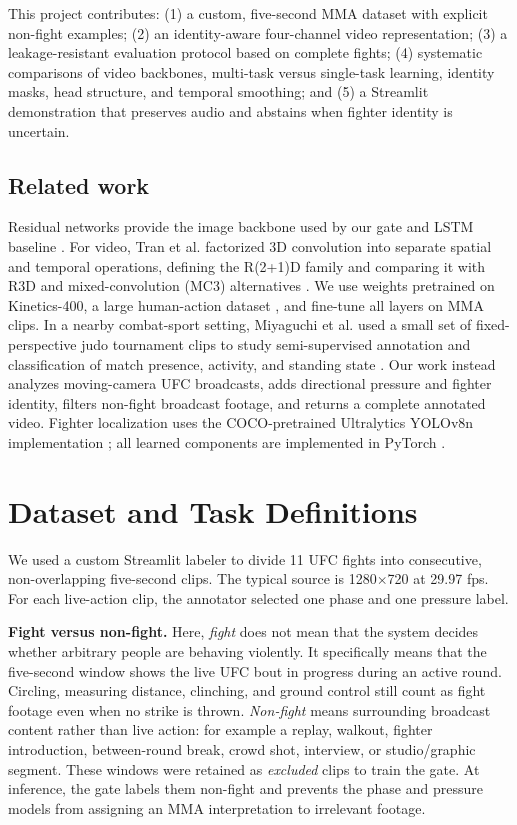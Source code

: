\documentclass[10pt,twocolumn]{article}
\newcommand{\Rtwo}{R(2+1)D}
\begin{document}
This project contributes: (1) a custom, five-second MMA dataset with explicit non-fight examples; (2) an identity-aware four-channel video representation; (3) a leakage-resistant evaluation protocol based on complete fights; (4) systematic comparisons of video backbones, multi-task versus single-task learning, identity masks, head structure, and temporal smoothing; and (5) a Streamlit demonstration that preserves audio and abstains when fighter identity is uncertain.

\subsection{Related work}

Residual networks provide the image backbone used by our gate and LSTM baseline \cite{he2016deep,hochreiter1997lstm}. For video, Tran et al. factorized 3D convolution into separate spatial and temporal operations, defining the \Rtwo{} family and comparing it with R3D and mixed-convolution (MC3) alternatives \cite{tran2018closer}. We use weights pretrained on Kinetics-400, a large human-action dataset \cite{kay2017kinetics}, and fine-tune all layers on MMA clips. In a nearby combat-sport setting, Miyaguchi et al. used a small set of fixed-perspective judo tournament clips to study semi-supervised annotation and classification of match presence, activity, and standing state \cite{miyaguchi2024judo}. Our work instead analyzes moving-camera UFC broadcasts, adds directional pressure and fighter identity, filters non-fight broadcast footage, and returns a complete annotated video. Fighter localization uses the COCO-pretrained Ultralytics YOLOv8n implementation \cite{jocher2023yolov8}; all learned components are implemented in PyTorch \cite{paszke2019pytorch}.

\section{Dataset and Task Definitions}

We used a custom Streamlit labeler to divide 11 UFC fights into consecutive, non-overlapping five-second clips. The typical source is 1280$\times$720 at 29.97 fps. For each live-action clip, the annotator selected one phase and one pressure label.

\textbf{Fight versus non-fight.} Here, \emph{fight} does not mean that the system decides whether arbitrary people are behaving violently. It specifically means that the five-second window shows the live UFC bout in progress during an active round. Circling, measuring distance, clinching, and ground control still count as fight footage even when no strike is thrown. \emph{Non-fight} means surrounding broadcast content rather than live action: for example a replay, walkout, fighter introduction, between-round break, crowd shot, interview, or studio/graphic segment. These windows were retained as \emph{excluded} clips to train the gate. At inference, the gate labels them non-fight and prevents the phase and pressure models from assigning an MMA interpretation to irrelevant footage.
\end{document}
